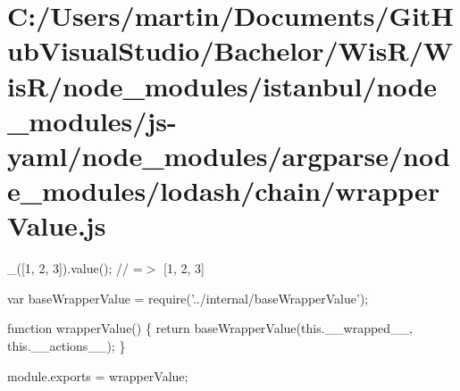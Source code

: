 \hypertarget{_c_1_2_users_2martin_2_documents_2_git_hub_visual_studio_2_bachelor_2_wis_r_2_wis_r_2node_module03b60d42ae33399a929616bf067709fd}{}\section{C\+:/\+Users/martin/\+Documents/\+Git\+Hub\+Visual\+Studio/\+Bachelor/\+Wis\+R/\+Wis\+R/node\+\_\+modules/istanbul/node\+\_\+modules/js-\/yaml/node\+\_\+modules/argparse/node\+\_\+modules/lodash/chain/wrapper\+Value.\+js}
\+\_\+(\mbox{[}1, 2, 3\mbox{]}).value(); // =$>$ \mbox{[}1, 2, 3\mbox{]}


\begin{DoxyCodeInclude}
var baseWrapperValue = require(\textcolor{stringliteral}{'../internal/baseWrapperValue'});

\textcolor{keyword}{function} wrapperValue() \{
  \textcolor{keywordflow}{return} baseWrapperValue(this.\_\_wrapped\_\_, this.\_\_actions\_\_);
\}

module.exports = wrapperValue;
\end{DoxyCodeInclude}
 